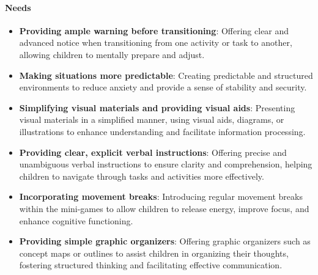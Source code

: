 \paragraph{Needs}
\begin{itemize}
    \item \textbf{Providing ample warning before transitioning}: Offering clear and advanced notice when transitioning from one activity or task to another, allowing children to mentally prepare and adjust.
    \item \textbf{Making situations more predictable}: Creating predictable and structured environments to reduce anxiety and provide a sense of stability and security.
    \item \textbf{Simplifying visual materials and providing visual aids}: Presenting visual materials in a simplified manner, using visual aids, diagrams, or illustrations to enhance understanding and facilitate information processing.
    \item \textbf{Providing clear, explicit verbal instructions}: Offering precise and unambiguous verbal instructions to ensure clarity and comprehension, helping children to navigate through tasks and activities more effectively.
    \item \textbf{Incorporating movement breaks}: Introducing regular movement breaks within the mini-games to allow children to release energy, improve focus, and enhance cognitive functioning.
    \item \textbf{Providing simple graphic organizers}: Offering graphic organizers such as concept maps or outlines to assist children in organizing their thoughts, fostering structured thinking and facilitating effective communication.
\end{itemize}